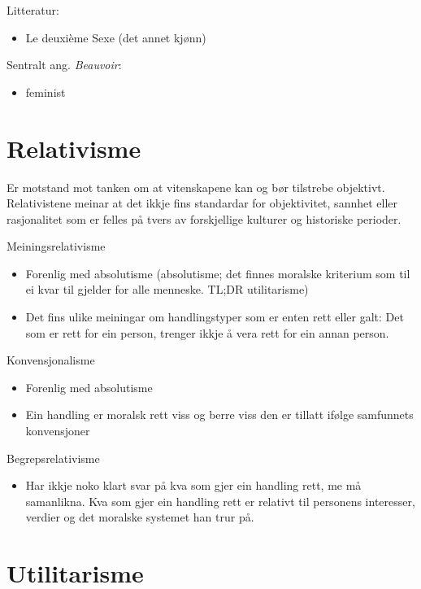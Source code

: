 \documentclass[a4paper]{IEEEtran}
\begin{document}
\begin{center}
Litteratur:
\end{center}
\begin{itemize}
    \item Le deuxième Sexe (det annet kjønn)
\end{itemize}\bigskip 

Sentralt ang. \textit{Beauvoir}:
\begin{itemize}\bigskip
     \item feminist
\end{itemize}\bigskip

\bigskip
\section{Relativisme}
\label{relativisme}
Er motstand mot tanken om at vitenskapene kan og bør tilstrebe objektivt. Relativistene meinar at det ikkje fins standardar for objektivitet, sannhet eller rasjonalitet som er felles på tvers av forskjellige kulturer og historiske perioder.
\bigskip

Meiningsrelativisme\bigskip
\begin{itemize}
    \item Forenlig med absolutisme (absolutisme; det finnes moralske kriterium som til ei kvar til gjelder for alle menneske. TL;DR utilitarisme)
    \item Det fins ulike meiningar om handlingstyper som er enten rett eller galt: Det som er rett for ein person, trenger ikkje å vera rett for ein annan person.
\end{itemize}\bigskip

Konvensjonalisme\bigskip
\begin{itemize}
    \item Forenlig med absolutisme
    \item Ein handling er moralsk rett viss og berre viss den er tillatt ifølge samfunnets konvensjoner
\end{itemize}\bigskip

Begrepsrelativisme\bigskip
\begin{itemize}
    \item Har ikkje noko klart svar på kva som gjer ein handling rett, me må samanlikna. Kva som gjer ein handling rett er relativt til personens interesser, verdier og det moralske systemet han trur på.
\end{itemize}

\bigskip
\section{Utilitarisme}
\label{utilitarisme}
\end{document}
